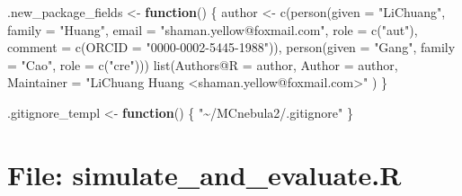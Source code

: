 \documentclass[
]{article}
\newenvironment{Shaded}{\begin{snugshade}}{\end{snugshade}}
\newcommand{\AttributeTok}[1]{\textcolor[rgb]{0.77,0.63,0.00}{#1}}
\newcommand{\ControlFlowTok}[1]{\textcolor[rgb]{0.13,0.29,0.53}{\textbf{#1}}}
\newcommand{\FunctionTok}[1]{\textcolor[rgb]{0.00,0.00,0.00}{#1}}
\newcommand{\NormalTok}[1]{#1}
\newcommand{\OtherTok}[1]{\textcolor[rgb]{0.56,0.35,0.01}{#1}}
\newcommand{\StringTok}[1]{\textcolor[rgb]{0.31,0.60,0.02}{#1}}
\begin{document}
\begin{Shaded}
\begin{Highlighting}[]
\NormalTok{.new\_package\_fields }\OtherTok{\textless{}{-}} \ControlFlowTok{function}\NormalTok{() \{}
\NormalTok{  author }\OtherTok{\textless{}{-}} \FunctionTok{c}\NormalTok{(}\FunctionTok{person}\NormalTok{(}\AttributeTok{given =} \StringTok{"LiChuang"}\NormalTok{, }\AttributeTok{family =} \StringTok{"Huang"}\NormalTok{,}
      \AttributeTok{email =} \StringTok{"shaman.yellow@foxmail.com"}\NormalTok{,}
      \AttributeTok{role =} \FunctionTok{c}\NormalTok{(}\StringTok{"aut"}\NormalTok{),}
      \AttributeTok{comment =} \FunctionTok{c}\NormalTok{(}\AttributeTok{ORCID =} \StringTok{"0000{-}0002{-}5445{-}1988"}\NormalTok{)),}
    \FunctionTok{person}\NormalTok{(}\AttributeTok{given =} \StringTok{"Gang"}\NormalTok{, }\AttributeTok{family =} \StringTok{"Cao"}\NormalTok{,}
      \AttributeTok{role =} \FunctionTok{c}\NormalTok{(}\StringTok{"cre"}\NormalTok{)))}
  \FunctionTok{list}\NormalTok{(}\StringTok{\textasciigrave{}}\AttributeTok{Authors@R}\StringTok{\textasciigrave{}} \OtherTok{=}\NormalTok{ author, }\AttributeTok{Author =}\NormalTok{ author,}
    \AttributeTok{Maintainer =} \StringTok{"LiChuang Huang \textless{}shaman.yellow@foxmail.com\textgreater{}"}
\NormalTok{  )}
\NormalTok{\}}

\NormalTok{.gitignore\_templ }\OtherTok{\textless{}{-}} \ControlFlowTok{function}\NormalTok{() \{}
  \StringTok{"\textasciitilde{}/MCnebula2/.gitignore"}
\NormalTok{\}}
\end{Highlighting}
\end{Shaded}

\hypertarget{file-simulate_and_evaluate.r}{%
\section{File: simulate\_and\_evaluate.R}\label{file-simulate_and_evaluate.r}}
\end{document}
